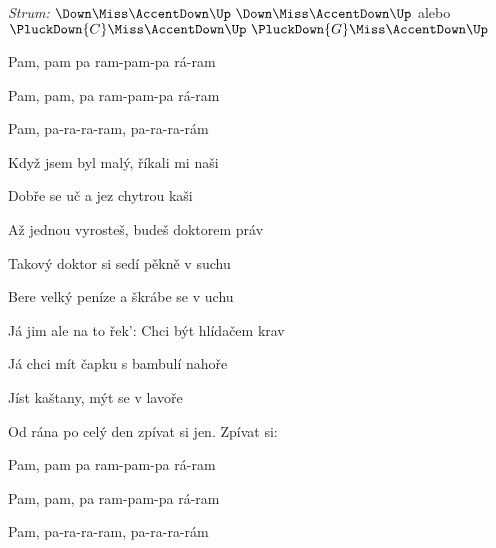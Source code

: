 \begin{song}


\begin{headerbox}
\RaiseBoxWithAccents
\textit{Strum:} $\Down\Miss\AccentDown\Up\ \Down\Miss\AccentDown\Up$ alebo $\PluckDown{C}\Miss\AccentDown\Up\ \PluckDown{G}\Miss\AccentDown\Up$
\end{headerbox}

\begin{vchordbox}
\vspace{-5em}
\end{vchordbox}

\Large

\bigskip

Pam, pam pa ram-pam-pa rá-ram \par
Pam, pam, pa ram-pam-pa rá-ram \par
{}Pam, pa-ra-ra-ram, pa-ra-ra-rám \par

\bigskip

Když jsem byl malý, říkali mi naši \par
Dobře se uč a jez chytrou kaši \par
{} Až jednou vyrosteš,  budeš doktorem práv \par
{} Takový doktor si sedí pěkně v suchu \par
Bere velký peníze a škrábe se v uchu \par
{}Já jim ale na to řek': Chci být hlídačem krav  \par

\bigskip

\begin{chorusbox}{\Refren}
Já chci mít čapku s bambulí nahoře \par
Jíst kaštany, mýt se v lavoře \par
{} Od rána po celý den zpívat si jen.  Zpívat si: \par

\bigskip

Pam, pam pa ram-pam-pa rá-ram \par
Pam, pam, pa ram-pam-pa rá-ram \par
{}Pam, pa-ra-ra-ram, pa-ra-ra-rám \par
\end{chorusbox}


\end{song}
